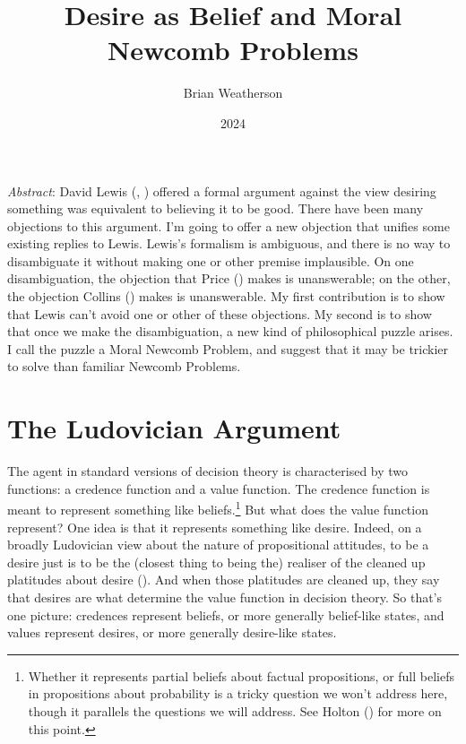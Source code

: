 \documentclass[
  11pt,
  letterpaper,
  DIV=11,
  numbers=noendperiod,
  twoside]{scrartcl}
\title{Desire as Belief and Moral Newcomb Problems}
\author{Brian Weatherson}
\date{2024}
\renewenvironment{abstract}
 {\vspace{-1.25cm}
 \quotation\small\noindent\emph{Abstract}:}
 {\endquotation}
\begin{document}
\maketitle
\begin{abstract}
David Lewis (,
) offered a formal argument against the
view desiring something was equivalent to believing it to be good. There
have been many objections to this argument. I'm going to offer a new
objection that unifies some existing replies to Lewis. Lewis's formalism
is ambiguous, and there is no way to disambiguate it without making one
or other premise implausible. On one disambiguation, the objection that
Price () makes is unanswerable; on the
other, the objection Collins () makes is
unanswerable. My first contribution is to show that Lewis can't avoid
one or other of these objections. My second is to show that once we make
the disambiguation, a new kind of philosophical puzzle arises. I call
the puzzle a Moral Newcomb Problem, and suggest that it may be trickier
to solve than familiar Newcomb Problems.
\end{abstract}


\section{The Ludovician Argument}\label{the-ludovician-argument}

The agent in standard versions of decision theory is characterised by
two functions: a credence function and a value function. The credence
function is meant to represent something like beliefs.\footnote{Whether
  it represents partial beliefs about factual propositions, or full
  beliefs in propositions about probability is a tricky question we
  won't address here, though it parallels the questions we will address.
  See Holton () for more on this point.}
But what does the value function represent? One idea is that it
represents something like desire. Indeed, on a broadly Ludovician view
about the nature of propositional attitudes, to be a desire just is to
be the (closest thing to being the) realiser of the cleaned up
platitudes about desire (). And
when those platitudes are cleaned up, they say that desires are what
determine the value function in decision theory. So that's one picture:
credences represent beliefs, or more generally belief-like states, and
values represent desires, or more generally desire-like states.
\end{document}
